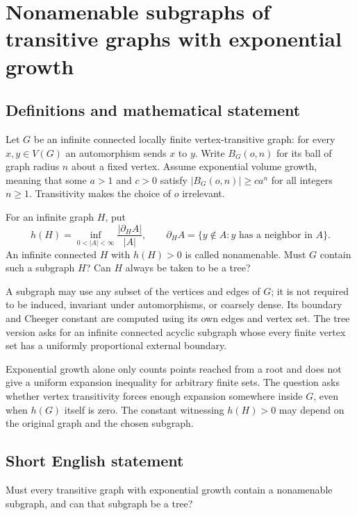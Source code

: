 \documentclass[11pt,a4paper]{article}
\begin{document}
\section*{Nonamenable subgraphs of transitive graphs with exponential growth}\label{statement}

\subsection{Definitions and mathematical statement}
Let $G$ be an infinite connected locally finite vertex-transitive graph: for every $x,y\in V(G)$ an automorphism sends $x$ to $y$. Write $B_G(o,n)$ for its ball of graph radius $n$ about a fixed vertex. Assume exponential volume growth, meaning that some $a>1$ and $c>0$ satisfy $|B_G(o,n)|\ge ca^n$ for all integers $n\ge1$. Transitivity makes the choice of $o$ irrelevant.

For an infinite graph $H$, put
\[
h(H)=\inf_{0<|A|<\infty}\frac{|\partial_H A|}{|A|},
\qquad
\partial_H A=\{y\notin A:y\text{ has a neighbor in }A\}.
\]
An infinite connected $H$ with $h(H)>0$ is called nonamenable. Must $G$ contain such a subgraph $H$? Can $H$ always be taken to be a tree?

A subgraph may use any subset of the vertices and edges of $G$; it is not required to be induced, invariant under automorphisms, or coarsely dense. Its boundary and Cheeger constant are computed using its own edges and vertex set. The tree version asks for an infinite connected acyclic subgraph whose every finite vertex set has a uniformly proportional external boundary.

Exponential growth alone only counts points reached from a root and does not give a uniform expansion inequality for arbitrary finite sets. The question asks whether vertex transitivity forces enough expansion somewhere inside $G$, even when $h(G)$ itself is zero. The constant witnessing $h(H)>0$ may depend on the original graph and the chosen subgraph.
\subsection{Short English statement}
Must every transitive graph with exponential growth contain a nonamenable subgraph, and can that subgraph be a tree?
\end{document}
